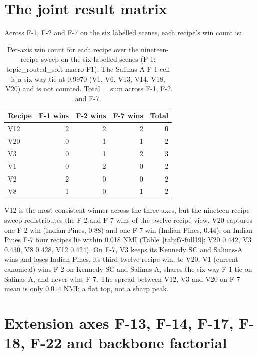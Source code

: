 \documentclass[journal,a4paper,10pt]{IEEEtran}
\begin{document}
\section{The joint result matrix}\label{sec:matrix}

Across F-1, F-2 and F-7 on the six labelled scenes, each recipe's win
count is:

\begin{table}[ht]
\caption{Per-axis win count for each recipe over the nineteen-recipe
sweep on the six labelled scenes (F-1: topic\_routed\_soft macro-F1).
The Salinas-A F-1 cell is a six-way tie at 0.9970 (V1, V6, V13, V14,
V18, V20) and is not counted. Total = sum across F-1, F-2 and F-7.}
\label{tab:wincount}
\centering
\small
\begin{tabular}{lrrrr}
\toprule
Recipe & F-1 wins & F-2 wins & F-7 wins & Total \\
\midrule
V12 & 2 & 2 & 2 & \textbf{6} \\
V20 & 0 & 1 & 1 & 2 \\
V3  & 0 & 1 & 2 & 3 \\
V1  & 0 & 2 & 0 & 2 \\
V2  & 2 & 0 & 0 & 2 \\
V8  & 1 & 0 & 1 & 2 \\
\bottomrule
\end{tabular}
\end{table}

V12 is the most consistent winner across the three axes, but the
nineteen-recipe sweep redistributes the F-2 and F-7 wins of the
twelve-recipe view. V20 captures one F-2 win (Indian Pines, $0.88$)
and one F-7 win (Indian Pines, $0.44$); on Indian Pines F-7 four
recipes lie within 0.018 NMI (Table~\ref{tab:f7-full19}: V20 0.442,
V3 0.430, V8 0.428, V12 0.424). On F-7, V3 keeps its Kennedy SC and
Salinas-A wins and loses Indian Pines, its third twelve-recipe win, to
V20. V1 (current canonical) wins F-2 on Kennedy SC and Salinas-A,
shares the six-way F-1 tie on Salinas-A, and never wins F-7. The
spread between V12, V3 and V20 on F-7 mean is only $0.014$ NMI: a flat
top, not a sharp peak.

\section{Extension axes F-13, F-14, F-17, F-18, F-22 and backbone factorial}
\label{sec:extensions}
\end{document}
